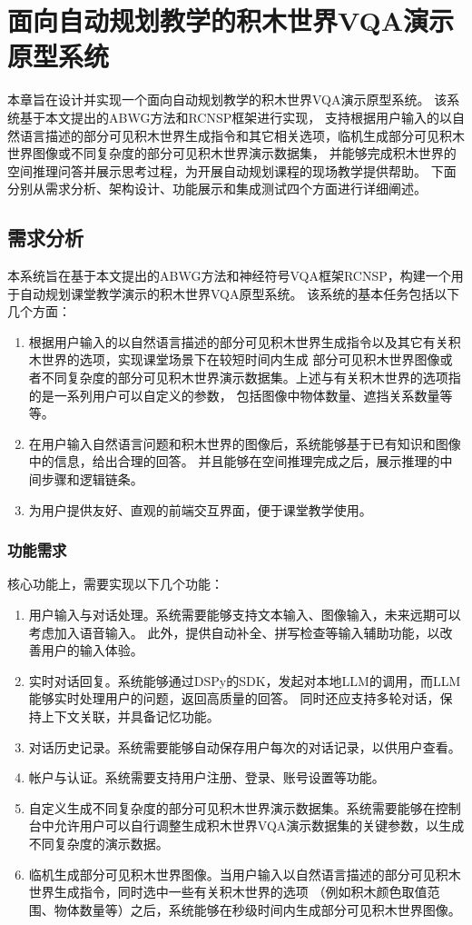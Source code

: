 \chapter{面向自动规划教学的积木世界VQA演示原型系统}
本章旨在设计并实现一个面向自动规划教学的积木世界VQA演示原型系统。
该系统基于本文提出的ABWG方法和RCNSP框架进行实现，
支持根据用户输入的以自然语言描述的部分可见积木世界生成指令和其它相关选项，临机生成部分可见积木世界图像或不同复杂度的部分可见积木世界演示数据集，
并能够完成积木世界的空间推理问答并展示思考过程，为开展自动规划课程的现场教学提供帮助。
下面分别从需求分析、架构设计、功能展示和集成测试四个方面进行详细阐述。
\section{需求分析}
本系统旨在基于本文提出的ABWG方法和神经符号VQA框架RCNSP，构建一个用于自动规划课堂教学演示的积木世界VQA原型系统。
该系统的基本任务包括以下几个方面：
\begin{enumerate}[nosep]
\item 根据用户输入的以自然语言描述的部分可见积木世界生成指令以及其它有关积木世界的选项，实现课堂场景下在较短时间内生成
部分可见积木世界图像或者不同复杂度的部分可见积木世界演示数据集。上述与有关积木世界的选项指的是一系列用户可以自定义的参数，
包括图像中物体数量、遮挡关系数量等等。
\item 在用户输入自然语言问题和积木世界的图像后，系统能够基于已有知识和图像中的信息，给出合理的回答。
并且能够在空间推理完成之后，展示推理的中间步骤和逻辑链条。
\item 为用户提供友好、直观的前端交互界面，便于课堂教学使用。
\end{enumerate}
\subsection{功能需求}
核心功能上，需要实现以下几个功能：
\begin{enumerate}[nosep]
\item 用户输入与对话处理。系统需要能够支持文本输入、图像输入，未来远期可以考虑加入语音输入。
此外，提供自动补全、拼写检查等输入辅助功能，以改善用户的输入体验。
\item 实时对话回复。系统能够通过DSPy的SDK，发起对本地LLM的调用，而LLM能够实时处理用户的问题，返回高质量的回答。
同时还应支持多轮对话，保持上下文关联，并具备记忆功能。
\item 对话历史记录。系统需要能够自动保存用户每次的对话记录，以供用户查看。
\item 帐户与认证。系统需要支持用户注册、登录、账号设置等功能。
\item 自定义生成不同复杂度的部分可见积木世界演示数据集。系统需要能够在控制台中允许用户可以自行调整生成积木世界VQA演示数据集的关键参数，以生成不同复杂度的演示数据。
\item 临机生成部分可见积木世界图像。当用户输入以自然语言描述的部分可见积木世界生成指令，同时选中一些有关积木世界的选项
（例如积木颜色取值范围、物体数量等）之后，系统能够在秒级时间内生成部分可见积木世界图像。
\end{enumerate}

